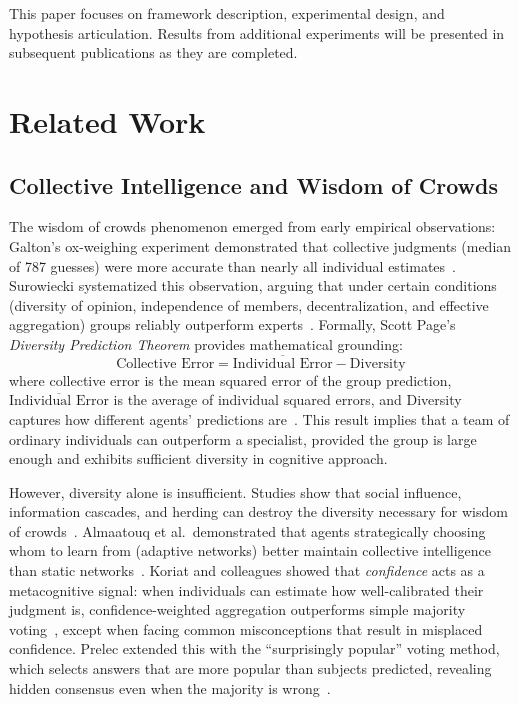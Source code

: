 \documentclass[sigconf]{aamas}
\begin{document}
This paper focuses on framework description, experimental design, and hypothesis articulation.
Results from additional experiments will be presented in subsequent publications as they are completed.

\section{Related Work}

\subsection{Collective Intelligence and Wisdom of Crowds}

The wisdom of crowds phenomenon emerged from early empirical observations:
Galton's ox-weighing experiment demonstrated that collective judgments (median of 787 guesses) were more accurate than nearly all individual estimates~\cite{galton1907}.
Surowiecki systematized this observation, arguing that under certain conditions (diversity of opinion, independence of members, decentralization, and effective aggregation) groups reliably outperform experts~\cite{surowiecki2004}.
Formally, Scott Page's \emph{Diversity Prediction Theorem} provides mathematical grounding:
\begin{equation}
  \text{Collective Error} = \overline{\text{Individual Error}} - \text{Diversity}
\end{equation}
where collective error is the mean squared error of the group prediction, \(\overline{\text{Individual Error}}\) is the average of individual squared errors, and Diversity captures how different agents' predictions are~\cite{page2007}.
This result implies that a team of ordinary individuals can outperform a specialist, provided the group is large enough and exhibits sufficient diversity in cognitive approach.

However, diversity alone is insufficient.
Studies show that social influence, information cascades, and herding can destroy the diversity necessary for wisdom of crowds~\cite{surowiecki2004,almaatouq2020}.
Almaatouq et al.\ demonstrated that agents strategically choosing whom to learn from (adaptive networks) better maintain collective intelligence than static networks~\cite{almaatouq2020}.
Koriat and colleagues showed that \emph{confidence} acts as a metacognitive signal:
when individuals can estimate how well-calibrated their judgment is, confidence-weighted aggregation outperforms simple majority voting~\cite{koriat2011}, except when facing common misconceptions that result in misplaced confidence.
Prelec extended this with the ``surprisingly popular'' voting method, which selects answers that are more popular than subjects predicted, revealing hidden consensus even when the majority is wrong~\cite{prelec2017}.
\end{document}
